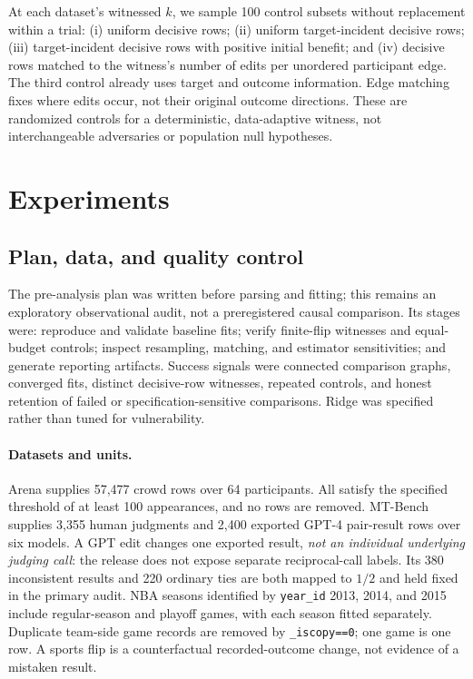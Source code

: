 \documentclass{article}
\begin{document}
At each dataset's witnessed $k$, we sample 100 control subsets without replacement within a trial: (i) uniform decisive rows; (ii) uniform target-incident decisive rows; (iii) target-incident decisive rows with positive initial benefit; and (iv) decisive rows matched to the witness's number of edits per unordered participant edge. The third control already uses target and outcome information. Edge matching fixes where edits occur, not their original outcome directions. These are randomized controls for a deterministic, data-adaptive witness, not interchangeable adversaries or population null hypotheses.

\section{Experiments}
\label{sec:experiments}
\subsection{Plan, data, and quality control}
\label{sec:data}
The pre-analysis plan was written before parsing and fitting; this remains an exploratory observational audit, not a preregistered causal comparison. Its stages were: reproduce and validate baseline fits; verify finite-flip witnesses and equal-budget controls; inspect resampling, matching, and estimator sensitivities; and generate reporting artifacts. Success signals were connected comparison graphs, converged fits, distinct decisive-row witnesses, repeated controls, and honest retention of failed or specification-sensitive comparisons. Ridge was specified rather than tuned for vulnerability.

\paragraph{Datasets and units.}
Arena supplies 57,477 crowd rows over 64 participants. All satisfy the specified threshold of at least 100 appearances, and no rows are removed. MT-Bench supplies 3,355 human judgments and 2,400 exported GPT-4 pair-result rows over six models. A GPT edit changes one exported result, \emph{not an individual underlying judging call}: the release does not expose separate reciprocal-call labels. Its 380 inconsistent results and 220 ordinary ties are both mapped to $1/2$ and held fixed in the primary audit. NBA seasons identified by \texttt{year\_id} 2013, 2014, and 2015 include regular-season and playoff games, with each season fitted separately. Duplicate team-side game records are removed by \texttt{\_iscopy==0}; one game is one row. A sports flip is a counterfactual recorded-outcome change, not evidence of a mistaken result.
\end{document}
